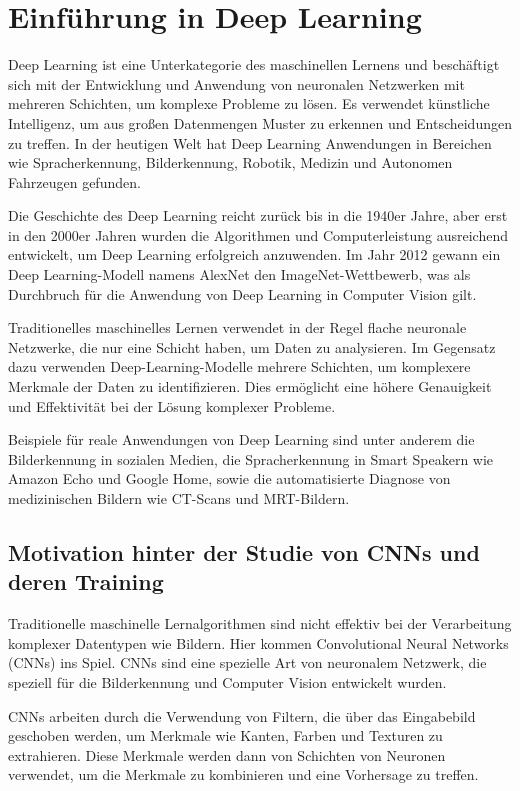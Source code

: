 \chapter{Einführung in Deep Learning}

Deep Learning ist eine Unterkategorie des maschinellen Lernens und beschäftigt sich mit der Entwicklung und Anwendung von neuronalen Netzwerken mit mehreren Schichten, um komplexe Probleme zu lösen. Es verwendet künstliche Intelligenz, um aus großen Datenmengen Muster zu erkennen und Entscheidungen zu treffen. In der heutigen Welt hat Deep Learning Anwendungen in Bereichen wie Spracherkennung, Bilderkennung, Robotik, Medizin und Autonomen Fahrzeugen gefunden. 

Die Geschichte des Deep Learning reicht zurück bis in die 1940er Jahre, aber erst in den 2000er Jahren wurden die Algorithmen und Computerleistung ausreichend entwickelt, um Deep Learning erfolgreich anzuwenden. Im Jahr 2012 gewann ein Deep Learning-Modell namens AlexNet den ImageNet-Wettbewerb, was als Durchbruch für die Anwendung von Deep Learning in Computer Vision gilt.

Traditionelles maschinelles Lernen verwendet in der Regel flache neuronale Netzwerke, die nur eine Schicht haben, um Daten zu analysieren. Im Gegensatz dazu verwenden Deep-Learning-Modelle mehrere Schichten, um komplexere Merkmale der Daten zu identifizieren. Dies ermöglicht eine höhere Genauigkeit und Effektivität bei der Lösung komplexer Probleme.

Beispiele für reale Anwendungen von Deep Learning sind unter anderem die Bilderkennung in sozialen Medien, die Spracherkennung in Smart Speakern wie Amazon Echo und Google Home, sowie die automatisierte Diagnose von medizinischen Bildern wie CT-Scans und MRT-Bildern.

\section{Motivation hinter der Studie von CNNs und deren Training}

Traditionelle maschinelle Lernalgorithmen sind nicht effektiv bei der Verarbeitung komplexer Datentypen wie Bildern. Hier kommen Convolutional Neural Networks (CNNs) ins Spiel. CNNs sind eine spezielle Art von neuronalem Netzwerk, die speziell für die Bilderkennung und Computer Vision entwickelt wurden. 

CNNs arbeiten durch die Verwendung von Filtern, die über das Eingabebild geschoben werden, um Merkmale wie Kanten, Farben und Texturen zu extrahieren. Diese Merkmale werden dann von Schichten von Neuronen verwendet, um die Merkmale zu kombinieren und eine Vorhersage zu treffen. 

